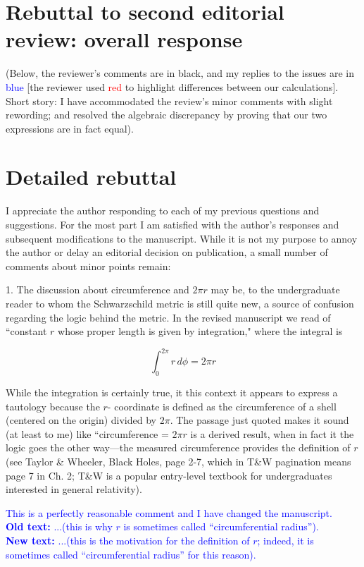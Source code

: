 \documentclass[12pt]{article}
\begin{document}
\section*{Rebuttal to second editorial review: overall response}

(Below, the reviewer's comments are in black, and my replies to the
issues are in \textcolor{blue}{blue} [the reviewer used
  \textcolor{red}{red} to highlight differences between our
  calculations].  Short story: I have accommodated the review's minor
comments with slight rewording; and resolved the algebraic discrepancy
by proving that our two expressions are in fact equal).


\section*{Detailed rebuttal}


I appreciate the author responding to each of my previous questions
and suggestions. For the most part I am satisfied with the author’s
responses and subsequent modifications to the manuscript. While it is
not my purpose to annoy the author or delay an editorial decision on
publication, a small number of comments about minor points remain:

1. The discussion about circumference and $2\pi r$ may be, to the
undergraduate reader to whom the Schwarzschild metric is still quite
new, a source of confusion regarding the logic behind the metric. In
the revised manuscript we read of ``constant $r$ whose proper length
is given by integration," where the integral is

\[
\int_{0}^{2\pi} r\,d\phi = 2\pi r
\]


While the integration is certainly true, it this context it appears to
express a tautology because the $r$- coordinate is defined as the
circumference of a shell (centered on the origin) divided by $2\pi$.
The passage just quoted makes it sound (at least to me) like
``circumference = $2\pi r$ is a derived result, when in fact it the
logic goes the other way---the measured circumference provides the
definition of $r$ (see Taylor \& Wheeler, Black Holes, page 2-7, which
in T\&W pagination means page 7 in Ch. 2; T\&W is a popular
entry-level textbook for undergraduates interested in general
relativity).

\textcolor{blue}{This is a perfectly reasonable comment and 
  I have changed the manuscript.\\
{\bf Old text:}
 ...(this is why $r$ is sometimes called ``circumferential radius'').\\
{\bf New text:} ...(this is the motivation for the definition of $r$;
indeed, it is  sometimes called ``circumferential radius'' for this
reason).
}
\end{document}
